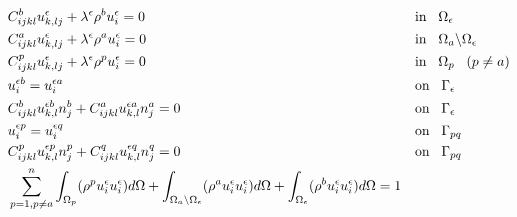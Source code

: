 \begin{align}
	&C_{ijkl}^{b}u_{k,lj}^{\epsilon}+\lambda^{\epsilon}\rho^{b} u_{i}^{\epsilon}=0&&\text{in}\hspace{0.3cm}\Omega_{\epsilon}
	\label{eq:govepmain}
	\\
	&C_{ijkl}^{a}u_{k,lj}^{\epsilon}+\lambda^{\epsilon}\rho^{a} u_{i}^{\epsilon}=0&&\text{in}\hspace{0.3cm}\Omega_{a}\backslash\Omega_{\epsilon}
	\label{eq:govepmain}
	\\
	&C_{ijkl}^{p}u_{k,lj}^{\epsilon}+\lambda^{\epsilon}\rho^{p} u_{i}^{\epsilon}=0&&\text{in}\hspace{0.3cm}\Omega_{p}\hspace{0.3cm}(p\neq a)
	\label{eq:govepmain}
	\\
	&u_{i}^{\epsilon b}=u_{i}^{\epsilon a} &&\text{on}\hspace{0.3cm}\Gamma_{\epsilon}
	\\
	&C_{ijkl}^{b}u_{k,l}^{\epsilon b}n_{j}^{b}+C_{ijkl}^{a}u_{k,l}^{\epsilon a}n_{j}^{a}=0 &&\text{on}\hspace{0.3cm}\Gamma_{\epsilon}
	\label{eq:govepbc}
	\\
	&u_{i}^{\epsilon p}=u_{i}^{\epsilon q} &&\text{on}\hspace{0.3cm}\Gamma_{pq}
	\\
	&C_{ijkl}^{p}u_{k,l}^{\epsilon p}n_{j}^{p}+C_{ijkl}^{q}u_{k,l}^{\epsilon q}n_{j}^{q}=0 &&\text{on}\hspace{0.3cm}\Gamma_{pq}
	\label{eq:govepbc}
	\\
	&\sum_{p=1,p\neq a}^{n}\int_{\Omega_p}(\rho^{p}u_{i}^{\epsilon}u_{i}^{\epsilon}) d\Omega
	+\int_{\Omega_a\backslash\Omega_{\epsilon}}(\rho^{a}u_{i}^{\epsilon}u_{i}^{\epsilon}) d\Omega
	+\int_{\Omega_{\epsilon}}(\rho^{b}u_{i}^{\epsilon}u_{i}^{\epsilon}) d\Omega=1
	\label{eq:govepnorm}
\end{align}

